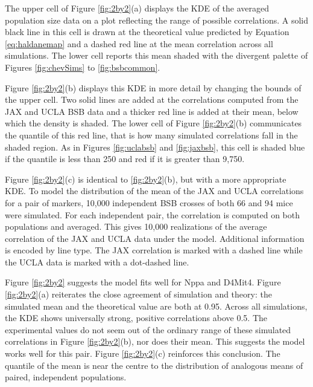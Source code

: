 \documentclass[sts]{imsart}
\begin{document}
The upper cell of Figure \ref{fig:2by2}(a) displays the KDE of the averaged population size data on a plot reflecting the range of possible correlations. A solid black line in this cell is drawn at the theoretical value predicted by Equation \ref{eq:haldanemap} and a dashed red line at the mean correlation across all simulations. The lower cell reports this mean shaded with the divergent palette of Figures \ref{fig:chevSims} to \ref{fig:bsbcommon}.

Figure \ref{fig:2by2}(b) displays this KDE in more detail by changing the bounds of the upper cell. Two solid lines are added at the correlations computed from the JAX and UCLA BSB data and a thicker red line is added at their mean, below which the density is shaded. The lower cell of Figure \ref{fig:2by2}(b) communicates the quantile of this red line, that is how many simulated correlations fall in the shaded region. As in Figures \ref{fig:uclabsb} and \ref{fig:jaxbsb}, this cell is shaded blue if the quantile is less than 250 and red if it is greater than 9,750.

Figure \ref{fig:2by2}(c) is identical to \ref{fig:2by2}(b), but with a more appropriate KDE. To model the distribution of the mean of the JAX and UCLA correlations for a pair of markers, 10,000 independent BSB crosses of both 66 and 94 mice were simulated. For each independent pair, the correlation is computed on both populations and averaged. This gives 10,000 realizations of the average correlation of the JAX and UCLA data under the model. Additional information is encoded by line type. The JAX correlation is marked with a dashed line while the UCLA data is marked with a dot-dashed line.

Figure \ref{fig:2by2} suggests the model fits well for Nppa and D4Mit4. Figure \ref{fig:2by2}(a) reiterates the close agreement of simulation and theory: the simulated mean and the theoretical value are both at 0.95. Across all simulations, the KDE shows universally strong, positive correlations above 0.5. The experimental values do not seem out of the ordinary range of these simulated correlations in Figure \ref{fig:2by2}(b), nor does their mean. This suggests the model works well for this pair. Figure \ref{fig:2by2}(c) reinforces this conclusion. The quantile of the mean is near the centre to the distribution of analogous means of paired, independent populations.
\end{document}
